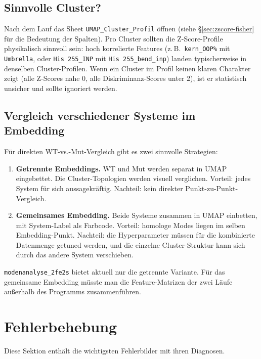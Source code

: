 \documentclass[11pt,a4paper,twoside]{article}
\theoremstyle{remark}
\begin{document}
\subsection{Sinnvolle Cluster?}

Nach dem Lauf das Sheet \texttt{UMAP\_Cluster\_Profil} \"offnen
(siehe \S\ref{sec:zscore-fisher} f\"ur die Bedeutung der Spalten).
Pro Cluster sollten die Z-Score-Profile physikalisch sinnvoll sein:
hoch korrelierte Features (z.\,B.\ \texttt{kern\_OOP\%} mit
\texttt{Umbrella}, oder \texttt{His 255\_INP} mit
\texttt{His 255\_bend\_inp}) landen typischerweise in denselben
Cluster-Profilen. Wenn ein Cluster im Profil keinen klaren
Charakter zeigt (alle Z-Scores nahe 0, alle Diskriminanz-Scores
unter 2), ist er statistisch unsicher und sollte ignoriert werden.

\subsection{Vergleich verschiedener Systeme im Embedding}

F\"ur direkten WT-vs.-Mut-Vergleich gibt es zwei sinnvolle
Strategien:

\begin{enumerate}
  \item \textbf{Getrennte Embeddings.} WT und Mut werden separat in
        UMAP eingebettet. Die Cluster-Topologien werden visuell
        verglichen. Vorteil: jedes System f\"ur sich aussagekr\"aftig.
        Nachteil: kein direkter Punkt-zu-Punkt-Vergleich.
  \item \textbf{Gemeinsames Embedding.} Beide Systeme zusammen in
        UMAP einbetten, mit System-Label als Farbcode. Vorteil:
        homologe Modes liegen im selben Embedding-Punkt. Nachteil:
        die Hyperparameter m\"ussen f\"ur die kombinierte Datenmenge
        getuned werden, und die einzelne Cluster-Struktur kann sich
        durch das andere System verschieben.
\end{enumerate}

\texttt{modenanalyse\_2fe2s} bietet aktuell nur die getrennte Variante.
F\"ur das gemeinsame Embedding m\"usste man die Feature-Matrizen
der zwei L\"aufe au\ss erhalb des Programms zusammenf\"uhren.


\section{Fehlerbehebung}
\label{sec:fehlerbehebung}

Diese Sektion enth\"alt die wichtigsten Fehlerbilder mit ihren
Diagnosen.
\end{document}
